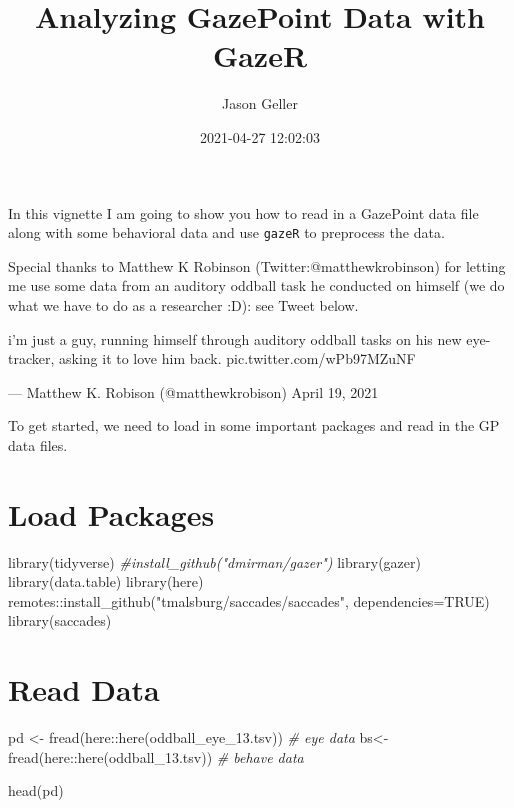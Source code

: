 \documentclass[
]{article}
\title{Analyzing GazePoint Data with GazeR}
\author{Jason Geller}
\date{2021-04-27 12:02:03}
\newenvironment{Shaded}{\begin{snugshade}}{\end{snugshade}}
\newcommand{\AttributeTok}[1]{\textcolor[rgb]{0.77,0.63,0.00}{#1}}
\newcommand{\CommentTok}[1]{\textcolor[rgb]{0.56,0.35,0.01}{\textit{#1}}}
\newcommand{\ConstantTok}[1]{\textcolor[rgb]{0.00,0.00,0.00}{#1}}
\newcommand{\FunctionTok}[1]{\textcolor[rgb]{0.00,0.00,0.00}{#1}}
\newcommand{\NormalTok}[1]{#1}
\newcommand{\OtherTok}[1]{\textcolor[rgb]{0.56,0.35,0.01}{#1}}
\newcommand{\SpecialCharTok}[1]{\textcolor[rgb]{0.00,0.00,0.00}{#1}}
\newcommand{\StringTok}[1]{\textcolor[rgb]{0.31,0.60,0.02}{#1}}
\begin{document}
\maketitle

In this vignette I am going to show you how to read in a GazePoint data
file along with some behavioral data and use \texttt{gazeR} to
preprocess the data.

Special thanks to Matthew K Robinson (Twitter:@matthewkrobinson) for
letting me use some data from an auditory oddball task he conducted on
himself (we do what we have to do as a researcher :D): see Tweet below.

i'm just a guy, running himself through auditory oddball tasks on his
new eye-tracker, asking it to love him back. pic.twitter.com/wPb97MZuNF

--- Matthew K. Robison (@matthewkrobison) April 19, 2021

To get started, we need to load in some important packages and read in
the GP data files.

\hypertarget{load-packages}{%
\section{Load Packages}\label{load-packages}}

\begin{Shaded}
\begin{Highlighting}[]
\FunctionTok{library}\NormalTok{(tidyverse)}
\CommentTok{\#install\_github("dmirman/gazer")}
\FunctionTok{library}\NormalTok{(gazer)}
\FunctionTok{library}\NormalTok{(data.table)}
\FunctionTok{library}\NormalTok{(here)}
\NormalTok{remotes}\SpecialCharTok{::}\FunctionTok{install\_github}\NormalTok{(}\StringTok{"tmalsburg/saccades/saccades"}\NormalTok{, }\AttributeTok{dependencies=}\ConstantTok{TRUE}\NormalTok{)}
\FunctionTok{library}\NormalTok{(saccades)}
\end{Highlighting}
\end{Shaded}

\hypertarget{read-data}{%
\section{Read Data}\label{read-data}}

\begin{Shaded}
\begin{Highlighting}[]
\NormalTok{pd }\OtherTok{\textless{}{-}} \FunctionTok{fread}\NormalTok{(here}\SpecialCharTok{::}\FunctionTok{here}\NormalTok{(}\StringTok{\textquotesingle{}oddball\_eye\_13.tsv\textquotesingle{}}\NormalTok{)) }\CommentTok{\# eye data }
\NormalTok{bs}\OtherTok{\textless{}{-}}\FunctionTok{fread}\NormalTok{(here}\SpecialCharTok{::}\FunctionTok{here}\NormalTok{(}\StringTok{\textquotesingle{}oddball\_13.tsv\textquotesingle{}}\NormalTok{)) }\CommentTok{\# behave data}

\FunctionTok{head}\NormalTok{(pd)}
\end{Highlighting}
\end{Shaded}
\end{document}

